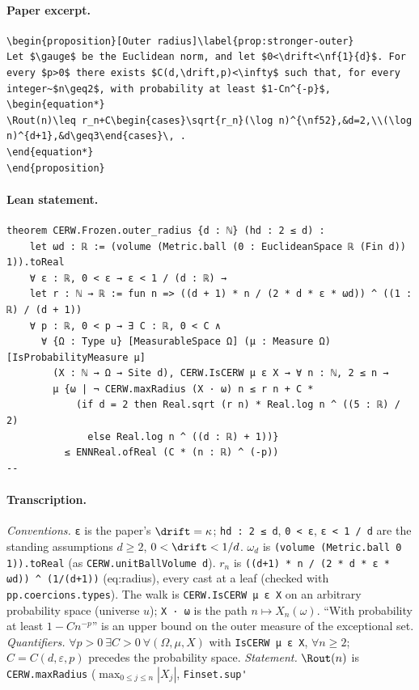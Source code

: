 \paragraph{Paper excerpt.}
\begin{verbatim}
\begin{proposition}[Outer radius]\label{prop:stronger-outer}
Let $\gauge$ be the Euclidean norm, and let $0<\drift<\nf{1}{d}$. For every $p>0$ there exists $C(d,\drift,p)<\infty$ such that, for every integer~$n\geq2$, with probability at least $1-Cn^{-p}$,
\begin{equation*}
\Rout(n)\leq r_n+C\begin{cases}\sqrt{r_n}(\log n)^{\nf52},&d=2,\\(\log n)^{d+1},&d\geq3\end{cases}\, .
\end{equation*}
\end{proposition}
\end{verbatim}
\paragraph{Lean statement.}
\begin{verbatim}
theorem CERW.Frozen.outer_radius {d : ℕ} (hd : 2 ≤ d) :
    let ωd : ℝ := (volume (Metric.ball (0 : EuclideanSpace ℝ (Fin d)) 1)).toReal
    ∀ ε : ℝ, 0 < ε → ε < 1 / (d : ℝ) →
    let r : ℕ → ℝ := fun n => ((d + 1) * n / (2 * d * ε * ωd)) ^ ((1 : ℝ) / (d + 1))
    ∀ p : ℝ, 0 < p → ∃ C : ℝ, 0 < C ∧
      ∀ {Ω : Type u} [MeasurableSpace Ω] (μ : Measure Ω) [IsProbabilityMeasure μ]
        (X : ℕ → Ω → Site d), CERW.IsCERW μ ε X → ∀ n : ℕ, 2 ≤ n →
        μ {ω | ¬ CERW.maxRadius (X · ω) n ≤ r n + C *
            (if d = 2 then Real.sqrt (r n) * Real.log n ^ ((5 : ℝ) / 2)
              else Real.log n ^ ((d : ℝ) + 1))}
          ≤ ENNReal.ofReal (C * (n : ℝ) ^ (-p))
--
\end{verbatim}
\paragraph{Transcription.}
\emph{Conventions.} \verb!ε! is the paper's $\drift=\kappa$; \verb!hd : 2 ≤ d!, \verb!0 < ε!, \verb!ε < 1 / d! are the standing assumptions $d\ge2$, $0<\drift<1/d$. $\omega_d$ is \verb!(volume (Metric.ball 0 1)).toReal! (as \verb!CERW.unitBallVolume d!). $r_n$ is \verb!((d+1) * n / (2 * d * ε * ωd)) ^ (1/(d+1))! (eq:radius), every cast at a leaf (checked with \verb!pp.coercions.types!). The walk is \verb!CERW.IsCERW μ ε X! on an arbitrary probability space (universe $u$); \verb!X · ω! is the path $n\mapsto X_n(\omega)$. ``With probability at least $1-Cn^{-p}$'' is an upper bound on the outer measure of the exceptional set. \emph{Quantifiers.} $\forall p>0\ \exists C>0\ \forall(\Omega,\mu,X)$ with \verb!IsCERW μ ε X!, $\forall n\ge2$; $C=C(d,\varepsilon,p)$ precedes the probability space. \emph{Statement.} $\Rout(n)$ is \verb!CERW.maxRadius! ($\max_{0\le j\le n}|X_j|$, \verb!Finset.sup'!
